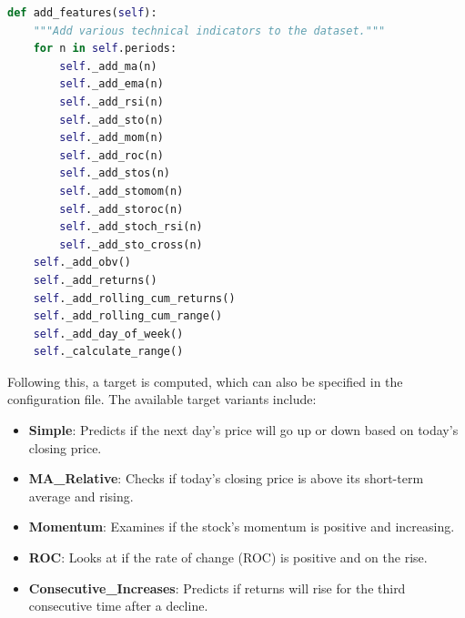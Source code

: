 \noindent\begin{minipage}{\linewidth}
\begin{lstlisting}[style=pythonstyle, language=Python, caption={Function to add features to the dataset},  captionpos=b, label=lst:add_features_function]
def add_features(self):
    """Add various technical indicators to the dataset."""
    for n in self.periods:
        self._add_ma(n)
        self._add_ema(n)
        self._add_rsi(n)
        self._add_sto(n)
        self._add_mom(n)
        self._add_roc(n)
        self._add_stos(n)
        self._add_stomom(n)
        self._add_storoc(n)
        self._add_stoch_rsi(n)
        self._add_sto_cross(n)
    self._add_obv()
    self._add_returns()
    self._add_rolling_cum_returns()
    self._add_rolling_cum_range()
    self._add_day_of_week()
    self._calculate_range()

\end{lstlisting}
\end{minipage}


Following this, a target is computed, which can also be specified in the configuration file. The available target variants include:
\begin{itemize}
    \item \textbf{Simple}: Predicts if the next day's price will go up or down based on today's closing price.
    \item \textbf{MA\_Relative}: Checks if today's closing price is above its short-term average and rising.
    \item \textbf{Momentum}: Examines if the stock's momentum is positive and increasing.
    \item \textbf{ROC}: Looks at if the rate of change (ROC) is positive and on the rise.
    \item \textbf{Consecutive\_Increases}: Predicts if returns will rise for the third consecutive time after a decline.
\end{itemize}


